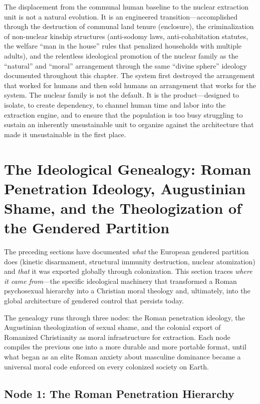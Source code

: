 \documentclass[12pt,openany]{book}
\begin{document}
The displacement from the communal human baseline to the nuclear extraction unit is not a natural evolution. It is an engineered transition---accomplished through the destruction of communal land tenure (enclosure), the criminalization of non-nuclear kinship structures (anti-sodomy laws, anti-cohabitation statutes, the welfare ``man in the house'' rules that penalized households with multiple adults), and the relentless ideological promotion of the nuclear family as the ``natural'' and ``moral'' arrangement through the same ``divine sphere'' ideology documented throughout this chapter. The system first destroyed the arrangement that worked for humans and then sold humans an arrangement that works for the system. The nuclear family is not the default. It is the product---designed to isolate, to create dependency, to channel human time and labor into the extraction engine, and to ensure that the population is too busy struggling to sustain an inherently unsustainable unit to organize against the architecture that made it unsustainable in the first place.

\section{The Ideological Genealogy: Roman Penetration Ideology, Augustinian Shame, and the Theologization of the Gendered Partition}

The preceding sections have documented \textit{what} the European gendered partition does (kinetic disarmament, structural immunity destruction, nuclear atomization) and \textit{that} it was exported globally through colonization. This section traces \textit{where it came from}---the specific ideological machinery that transformed a Roman psychosexual hierarchy into a Christian moral theology and, ultimately, into the global architecture of gendered control that persists today.

The genealogy runs through three nodes: the Roman penetration ideology, the Augustinian theologization of sexual shame, and the colonial export of Romanized Christianity as moral infrastructure for extraction. Each node compiles the previous one into a more durable and more portable format, until what began as an elite Roman anxiety about masculine dominance became a universal moral code enforced on every colonized society on Earth.

\subsection{Node 1: The Roman Penetration Hierarchy}
\end{document}
